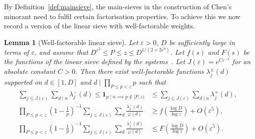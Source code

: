 \documentclass[12pt]{amsart}
\newtheorem{lemma}[theorem]{Lemma}
\theoremstyle{definition}
\theoremstyle{remark}
\numberwithin{equation}{section}
\newcommand{\1}{\mathbf{1}}
\begin{document}
By Definition~\ref{def:mainsieve}, the main-sieves in the construction of Chen's minorant need to fulfil certain factorisation properties. To achieve this we now record a version of the linear sieve with well-factorable weights.

\begin{lemma}[Well-factorable linear sieve]\label{lem:wellfac}
    Let $\varepsilon>0$, $D$ be sufficiently large in terms of $\varepsilon$, and assume that $D^{\varepsilon^2}\leq P\leq z \leq D^{1/(2+2\varepsilon^{9})}$. Let $f(s)$ and $F(s)$ be the functions of the linear sieve defined by the systems~\cite[eq. (12.1), (12.2)]{cribro}. Let $J(\varepsilon)=e^{C\varepsilon^{-3}}$ for an absolute constant $C>0$. Then there exist well-factorable functions $\lambda_j^\pm(d)$ supported on $d\in [1,D]$ and $d\mid\prod_{P\leq p<z}p$ such that
    \begin{align*}
      \sum_{j\leq J(\varepsilon)}\sum_{d\mid n}  \lambda_j^-(d) \leq \1_{p\mid n \implies p\not \in [P,z)}& \leq \sum_{j\leq J(\varepsilon)}\sum_{d\mid n}  \lambda_j^+(d),\\
       \prod_{P\leq p < z}\left(1-\frac{1}{p}\right)^{-1} \sum_{j\leq J(\varepsilon)} \sum_{d}\frac{\lambda_j^-(d)}{\varphi(d)}&\geq f\left(\frac{\log D}{\log z}\right)+O(\varepsilon^5),\\
      \prod_{P\leq p < z}\left(1-\frac{1}{p}\right)^{-1}\sum_{j\leq J(\varepsilon)} \sum_{d} \frac{\lambda_j^+(d)}{\varphi(d)}&\leq F\left(\frac{\log D}{\log z}\right)+O(\varepsilon^5).
    \end{align*}
\end{lemma}
\end{document}
